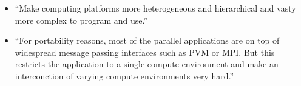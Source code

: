 \begin{itemize}
  \item ``Make computing platforms more heterogeneous and hierarchical
    and vasty more complex to program and use.''

  \item ``For portability reasons, most of the parallel applications are on top
    of widespread message passing interfaces such as PVM or MPI. But
    this restricts the application to a single compute environment and
    make an interconction of varying compute environments very hard.''

\end{itemize}


\cleardoublepage

